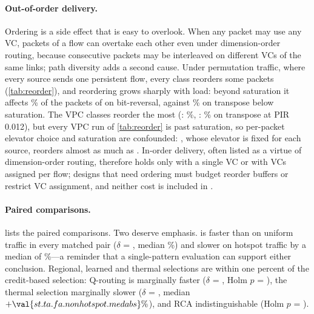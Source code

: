 \paragraph{Out-of-order delivery.} Ordering is a side effect that is easy to overlook. When any packet may use any VC, packets of a flow can overtake each other even under dimension-order routing, because consecutive packets may be interleaved on different VCs of the same links; path diversity adds a second cause. Under permutation traffic, where every source sends one persistent flow, every class reorders some packets (\cref{tab:reorder}), and reordering grows sharply with load: beyond saturation it affects \% of the packets of  on bit-reversal, against \% on transpose below saturation. The VPC classes reorder the most (: \%, : \% on transpose at PIR 0.012), but every VPC run of \cref{tab:reorder} is past saturation, so per-packet elevator choice and saturation are confounded: , whose elevator is fixed for each source, reorders almost as much as . In-order delivery, often listed as a virtue of dimension-order routing, therefore holds only with a single VC or with VCs assigned per flow; designs that need ordering must budget reorder buffers or restrict VC assignment, and neither cost is included in .

\begin{table}[tbp]
\centering
\caption{Out-of-order delivery: percentage of delivered packets ejected before an earlier-created packet of the same source--destination flow, permutation traffic, three seeds.}
\label{tab:reorder}
\small

\end{table}

\paragraph{Paired comparisons.}  lists the  paired comparisons. Two deserve emphasis.  is faster than  on uniform traffic in every matched pair ($\delta$ = , median \%) and slower on hotspot traffic by a median of \%---a reminder that a single-pattern evaluation can support either conclusion. Regional, learned and thermal selections are within one percent of the credit-based selection: Q-routing is marginally faster ($\delta$ = , Holm $p$ = ), the thermal selection marginally slower ($\delta$ = , median $+\val{st.ta.fa.nonhotspot.medabs}\%$), and RCA indistinguishable (Holm $p$ = ).

